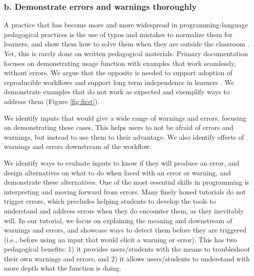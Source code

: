 \documentclass[12pt]{article}
\begin{document}

\subsubsection*{b. Demonstrate errors and warnings thoroughly}

A practice that has become more and more widespread in programming-language pedagogical practices
is the use of typos and mistakes to normalize them for learners, and show them how
to solve them when they are outside the classroom \citep{shannon2015live}.
Yet, this is rarely done on written pedagogical materials.
Primary documentation focuses on demonstrating usage function with examples that
work seamlessly, without errors. We argue that the opposite is needed to support
adoption of reproducible workflows and support long term independence in learners
\citep{gaspar2007restoring}.
We demonstrate examples that do not work
as expected and exemplify ways to address them (Figure \ref{fig:first}).

We identify inputs that would give
a wide range of warnings and errors, focusing on demonstrating these cases. This
helps users to not be afraid of errors and warnings, but instead to use them to
their advantage.
We also identify effects of warnings and errors downstream of the workflow.

We identify ways to evaluate inputs to know if they will produce an error, and design
alternatives on what to do when faced with an error or warning, and demonstrate
these alternatives.
One of the most essential skills in programming is interpreting and moving forward
from errors.
Many finely honed tutorials do not trigger errors, which precludes helping students
to develop the tools to understand and address errors when they do encounter them,
as they inevitably will.
In our tutorial, we focus on explaining the meaning and downstream of warnings and errors, and
 showcase ways to detect them before they are triggered (i.e., before using an input
  that would elicit a warning or error). This has two pedagogical benefits:
1) it provides users/students with the means to troubleshoot their own warnings and errors, and
2) it allows users/students to understand with more depth what the function is doing.

\end{document}
